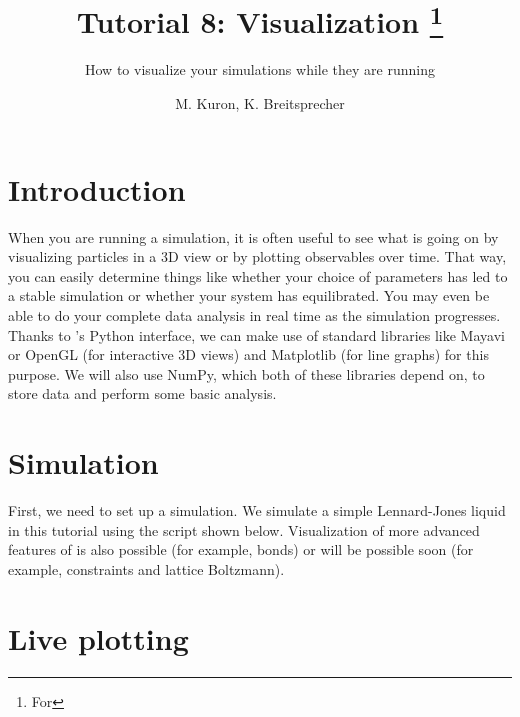 \documentclass[
paper=a4,                       %
fontsize=11pt,                  %
twoside,                        %
footsepline,                    %
headsepline,                    %
headinclude=false,              %
footinclude=false,              %
pagesize,                       %
]{scrartcl}
\begin{document}
\esptitlehead

\title{Tutorial 8: Visualization%
\ifdefined\esversion%
\thanks{For \es \esversion}%
\fi%
}
\subtitle{How to visualize your \es simulations while they are running}
\author{M. Kuron, K. Breitsprecher}
\maketitle

\section{Introduction}
\label{intro}

When you are running a simulation, it is often useful to see what is going on by visualizing particles in a 3D view or by plotting observables over time.
That way, you can easily determine things like whether your choice of parameters has led to a stable simulation or whether your system has equilibrated.
You may even be able to do your complete data analysis in real time as the simulation progresses.\\

\noindent Thanks to \es's Python interface, we can make use of standard libraries like Mayavi or OpenGL (for interactive 3D views) and Matplotlib (for line graphs) for this purpose.
We will also use NumPy, which both of these libraries depend on, to store data and perform some basic analysis.

\section{Simulation}
\label{sim}

First, we need to set up a simulation.
We simulate a simple Lennard-Jones liquid in this tutorial using the script shown below.
Visualization of more advanced features of \es is also possible (for example, bonds) or will be possible soon (for example, constraints and lattice Boltzmann).



\section{Live plotting}
\label{plot}
\end{document}
